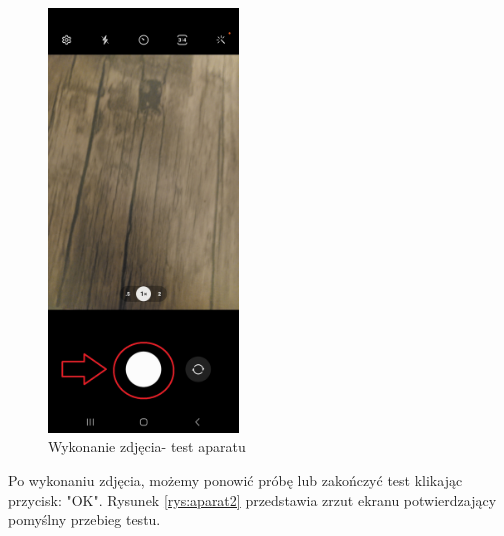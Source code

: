 \begin{figure}[!hbt]
	\begin{center}
		\includegraphics[angle=360, width=0.45\textwidth]{rys/punkt6/aparat1}
		\caption{Wykonanie zdjęcia- test aparatu}
		\label{rys:aparat1}
	\end{center}
\end{figure}

\newpage


Po wykonaniu zdjęcia, możemy ponowić próbę lub zakończyć test klikając przycisk: "OK". Rysunek \ref{rys:aparat2} przedstawia zrzut ekranu potwierdzający pomyślny przebieg testu.

